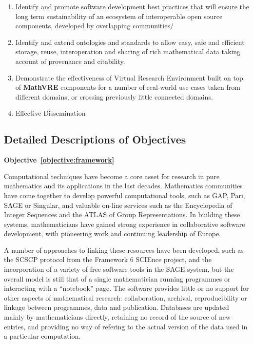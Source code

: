 \documentclass[a4paper,11pt]{article}
\newcommand{\XX}{\textbf{MathVRE}\xspace}
\newcommand{\TheProject}{\XX}
\begin{document}
\begin{enumerate}
\item \label{objective:devel}Identify and promote software development best practices that will
  ensure the long term sustainability of an ecosystem of interoperable
  open source components,  developed by overlapping communities/


\item \label{objective:data}Identify and extend ontologies and standards to
  allow easy, safe and efficient storage, reuse, interoperation and sharing of rich mathematical
  data taking account of provenance and citability.

\item \label{objective:demo}Demonstrate the effectiveness of Virtual Research Environment
  built on top of \TheProject components for a number of real-world
  use cases taken from different domains, or crossing previously
  little connected domains.

\item \label{objective:disseminate}Effective Dissemination

\end{enumerate}

\subsection*{Detailed Descriptions of Objectives} %

\textbf{Objective~\ref{objective:framework}}

Computational techniques have become a core asset for research in pure
  mathematics and its applications in the last decades. Mathematics
  communities have come together to develop powerful computational
  tools, such as GAP, Pari, SAGE or Singular, and valuable on-line
  services such as the Encyclopedia of Integer Sequences and the ATLAS
  of Group Representations.  In building these systems, 
  mathematicians have gained strong
  experience in collaborative software development, with pioneering
  work and continuing leadership of Europe.

A number of approaches to linking these resources have been developed,
such as the SCSCP protocol from the Framework 6 SCIEnce project, and
the incorporation of a variety of free software tools in the SAGE
system, but the overall model is still that of a single mathematician
running programmes or interacting with a ``notebook''
page. The software provides little or no support for other aspects of
mathematical research: collaboration,
archival, reproducibility or linkage between programmes, data and
publication. Databases are updated mainly by mathematicians directly,
retaining no record of the source of new entries, and providing no way
of refering to the actual version of the data used in a particular
computation.
\end{document}
